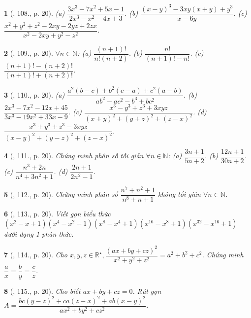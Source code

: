 \documentclass{article}
\newtheorem{baitoan}{}
\begin{document}
\begin{baitoan}[\cite{Binh_Toan_8_tap_1}, 108., p. 20]
	(a) $\dfrac{3x^3 - 7x^2 + 5x - 1}{2x^3 - x^2 - 4x + 3}$. (b) $\dfrac{(x - y)^3 - 3xy(x + y) + y^3}{x - 6y}$. (c) $\dfrac{x^2 + y^2 + z^2 - 2xy - 2yz + 2zx}{x^2 - 2xy + y^2 - z^2}$.
\end{baitoan}

\begin{baitoan}[\cite{Binh_Toan_8_tap_1}, 109., p. 20]
	$\forall n\in\mathbb{N}$: (a) $\dfrac{(n + 1)!}{n!(n + 2)}$. (b) $\dfrac{n!}{(n + 1)! - n!}$. (c) $\dfrac{(n + 1)! - (n + 2)!}{(n + 1)! + (n + 2)!}$.
\end{baitoan}

\begin{baitoan}[\cite{Binh_Toan_8_tap_1}, 110., p. 20]
	(a) $\dfrac{a^2(b - c) + b^2(c - a) + c^2(a - b)}{ab^2 - ac^2 - b^3 + bc^2}$. (b) $\dfrac{2x^3 - 7x^2 - 12x + 45}{3x^3 - 19x^2 + 33x - 9}$. (c) $\dfrac{x^3 - y^3 + z^3 + 3xyz}{(x + y)^2 + (y + z)^2 + (z - x)^2}$. (d) $\dfrac{x^3 + y^3 + z^3 - 3xyz}{(x - y)^2 + (y - z)^2 + (z - x)^2}$.
\end{baitoan}

\begin{baitoan}[\cite{Binh_Toan_8_tap_1}, 111., p. 20]
	Chứng minh phân số tối giản $\forall n\in\mathbb{N}$: (a) $\dfrac{3n + 1}{5n + 2}$. (b) $\dfrac{12n + 1}{30n + 2}$. (c) $\dfrac{n^3 + 2n}{n^4 + 3n^2 + 1}$. (d) $\dfrac{2n + 1}{2n^2 - 1}$.
\end{baitoan}

\begin{baitoan}[\cite{Binh_Toan_8_tap_1}, 112., p. 20]
	Chứng minh phân số $\dfrac{n^7 + n^2 + 1}{n^8 + n + 1}$ không tối giản $\forall n\in\mathbb{N}$.
\end{baitoan}

\begin{baitoan}[\cite{Binh_Toan_8_tap_1}, 113., p. 20]
	Viết gọn biểu thức $(x^2 - x + 1)(x^4 - x^2 + 1)(x^8 - x^4 + 1)(x^{16} - x^8 + 1)(x^{32} - x^{16} + 1)$ dưới dạng 1 phân thức.
\end{baitoan}

\begin{baitoan}[\cite{Binh_Toan_8_tap_1}, 114., p. 20]
	Cho $x,y,z\in\mathbb{R}^\star,\dfrac{(ax + by + cz)^2}{x^2 + y^2 + z^2} = a^2 + b^2 + c^2$. Chứng minh $\dfrac{a}{x} = \dfrac{b}{y} = \dfrac{c}{z}$.
\end{baitoan}

\begin{baitoan}[\cite{Binh_Toan_8_tap_1}, 115., p. 20]
	Cho biết $ax + by + cz = 0$. Rút gọn $A = \dfrac{bc(y - z)^2 + ca(z - x)^2 + ab(x - y)^2}{ax^2 + by^2 + cz^2}$.
\end{baitoan}
\end{document}
